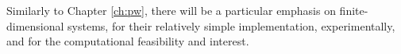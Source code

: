 Similarly to Chapter \ref{ch:pw},
there will be a particular emphasis on finite-dimensional systems,
for their relatively simple implementation, experimentally,
and for the computational feasibility and interest.
